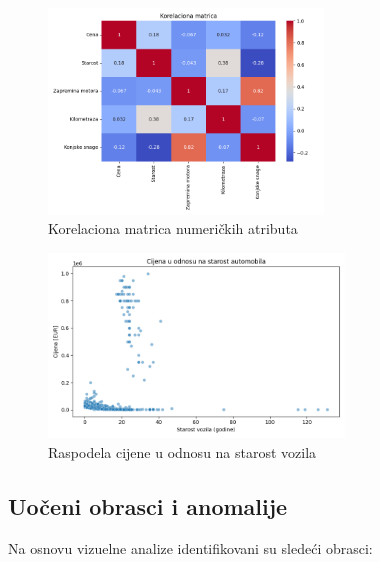 \documentclass[a4paper,12pt]{article}
\begin{document}
\begin{figure}[H]
    \centering
    \includegraphics[width=0.65\textwidth]{corr_matrix.png}
    \caption{Korelaciona matrica numeričkih atributa}
    \label{fig:corr_matrix}
\end{figure}

\begin{figure}[H]
    \centering
    \includegraphics[width=0.7\textwidth]{scatter_starost_vs_cena.png}
    \caption{Raspodela cijene u odnosu na starost vozila}
    \label{fig:starost_vs_cena}
\end{figure}

\subsection{Uočeni obrasci i anomalije}

Na osnovu vizuelne analize identifikovani su sledeći obrasci:
\end{document}
